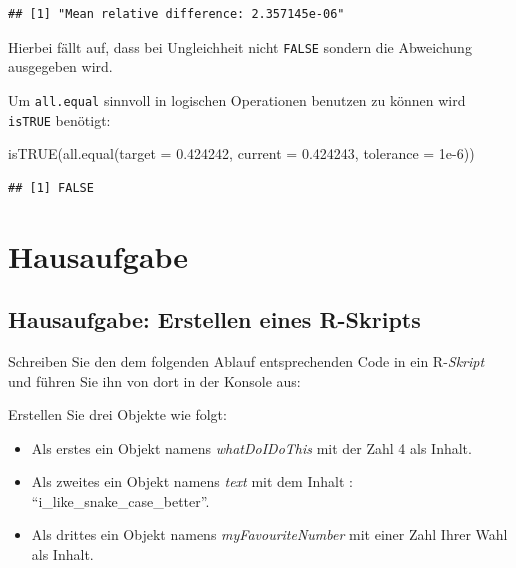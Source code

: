 \documentclass[
]{book}
\newenvironment{Shaded}{\begin{snugshade}}{\end{snugshade}}
\newcommand{\AttributeTok}[1]{\textcolor[rgb]{0.77,0.63,0.00}{#1}}
\newcommand{\FloatTok}[1]{\textcolor[rgb]{0.00,0.00,0.81}{#1}}
\newcommand{\FunctionTok}[1]{\textcolor[rgb]{0.00,0.00,0.00}{#1}}
\newcommand{\NormalTok}[1]{#1}
\begin{document}
\begin{verbatim}
## [1] "Mean relative difference: 2.357145e-06"
\end{verbatim}

Hierbei fällt auf, dass bei Ungleichheit nicht \texttt{FALSE} sondern die Abweichung ausgegeben wird.

Um \texttt{all.equal} sinnvoll in logischen Operationen benutzen zu können wird \texttt{isTRUE} benötigt:

\begin{Shaded}
\begin{Highlighting}[]
\FunctionTok{isTRUE}\NormalTok{(}\FunctionTok{all.equal}\NormalTok{(}\AttributeTok{target =} \FloatTok{0.424242}\NormalTok{,}
                 \AttributeTok{current =} \FloatTok{0.424243}\NormalTok{,}
                 \AttributeTok{tolerance =} \FloatTok{1e{-}6}\NormalTok{))}
\end{Highlighting}
\end{Shaded}

\begin{verbatim}
## [1] FALSE
\end{verbatim}

\hypertarget{hausaufgabe}{%
\section{Hausaufgabe}\label{hausaufgabe}}

\hypertarget{hausaufgabe-erstellen-eines-r-skripts}{%
\subsection*{Hausaufgabe: Erstellen eines R-Skripts}\label{hausaufgabe-erstellen-eines-r-skripts}}

Schreiben Sie den dem folgenden Ablauf entsprechenden Code in ein R-\emph{Skript} und führen Sie ihn von dort in der Konsole aus:

Erstellen Sie drei Objekte wie folgt:

\begin{itemize}
\item
  Als erstes ein Objekt namens \emph{whatDoIDoThis} mit der Zahl 4 als Inhalt.
\item
  Als zweites ein Objekt namens \emph{text} mit dem Inhalt : ``i\_like\_snake\_case\_better''.
\item
  Als drittes ein Objekt namens \emph{myFavouriteNumber} mit einer Zahl Ihrer Wahl als Inhalt.
\end{itemize}
\end{document}
